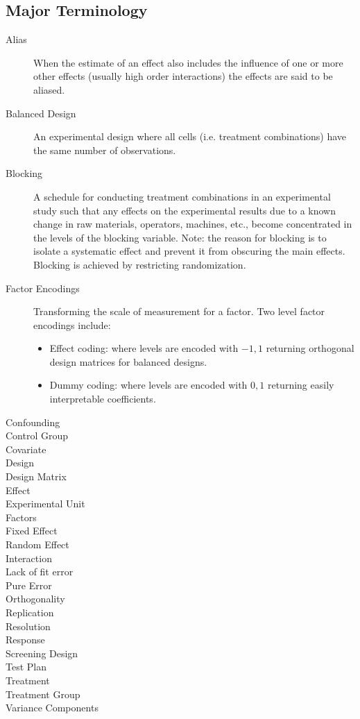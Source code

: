 \subsection{Major Terminology}

\begin{description}
\item [Alias] When the estimate of an effect also includes the influence of one or more other effects (usually high order interactions) the effects are said to be aliased.
\item [Balanced Design] An experimental design where all cells (i.e. treatment combinations) have the same number of observations.
\item [Blocking] A schedule for conducting treatment combinations in an experimental study such that any effects on the experimental results due to a known change in raw materials, operators, machines, etc., become concentrated in the levels of the blocking variable. Note: the reason for blocking is to isolate a systematic effect and prevent it from obscuring the main effects. Blocking is achieved by restricting randomization.
\item [Factor Encodings] Transforming the scale of measurement for a factor. 
Two level factor encodings include:
\begin{itemize}
\item Effect coding: where levels are encoded with $-1,1$ returning orthogonal design matrices for balanced designs.
\item Dummy coding: where levels are encoded with $0,1$ returning easily interpretable coefficients.
\end{itemize}

\item [Confounding]
\item [Control Group]
\item [Covariate]
\item [Design]
\item [Design Matrix]
\item [Effect]
\item [Experimental Unit]
\item [Factors]
\item [Fixed Effect]
\item [Random Effect]
\item [Interaction]
\item [Lack of fit error]
\item [Pure Error]
\item [Orthogonality]
\item [Replication]
\item [Resolution]
\item [Response]
\item [Screening Design]
\item [Test Plan]
\item [Treatment]
\item [Treatment Group]
\item [Variance Components]
\end{description}



